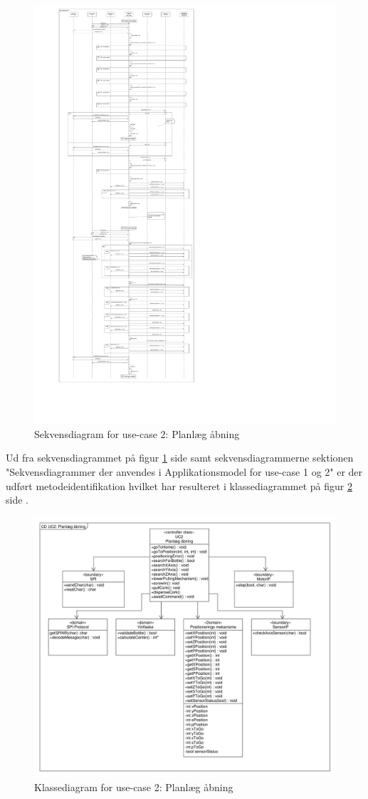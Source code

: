 \begin{figure}[H]
	\caption{Sekvensdiagram for use-case 2: Planlæg åbning}
	\label{SD:PSoC:UC2}
	\includegraphics[scale=0.18,trim=0 0 0 0, clip]{APPSoC/UC2-planlaeg-aabning-v1-simplified}
\end{figure}

Ud fra sekvensdiagrammet på figur \ref{SD:PSoC:UC2} side \pageref{SD:PSoC:UC2} samt sekvensdiagrammerne sektionen "Sekvensdiagrammer der anvendes i Applikationsmodel for use-case 1 og 2" er der udført metodeidentifikation hvilket har resulteret i klassediagrammet på figur \ref{CD:PSoC:UC2} side \pageref{CD:PSoC:UC2}.

\begin{figure}[H]
	\caption{Klassediagram for use-case 2: Planlæg åbning}
	\label{CD:PSoC:UC2}
	\includegraphics[scale=0.35,trim=0 0 0 0, clip]{APPSoC/UC2-CD-planlaeg-aabning-PSoC}
\end{figure}
